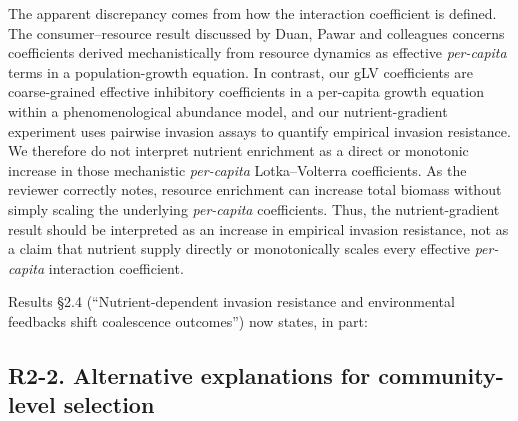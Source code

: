 \responselabel
The apparent discrepancy comes from how the interaction coefficient is defined. The consumer--resource result discussed by Duan, Pawar and colleagues concerns coefficients derived mechanistically from resource dynamics as effective \emph{per-capita} terms in a population-growth equation. In contrast, our gLV coefficients are coarse-grained effective inhibitory coefficients in a per-capita growth equation within a phenomenological abundance model, and our nutrient-gradient experiment uses pairwise invasion assays to quantify empirical invasion resistance. We therefore do not interpret nutrient enrichment as a direct or monotonic increase in those mechanistic \emph{per-capita} Lotka--Volterra coefficients. As the reviewer correctly notes, resource enrichment can increase total biomass without simply scaling the underlying \emph{per-capita} coefficients. Thus, the nutrient-gradient result should be interpreted as an increase in empirical invasion resistance, not as a claim that nutrient supply directly or monotonically scales every effective \emph{per-capita} interaction coefficient.

Results \S2.4 (``Nutrient-dependent invasion resistance and environmental feedbacks shift coalescence outcomes'') now states, in part: 

\subsection*{R2-2. Alternative explanations for community-level selection}

